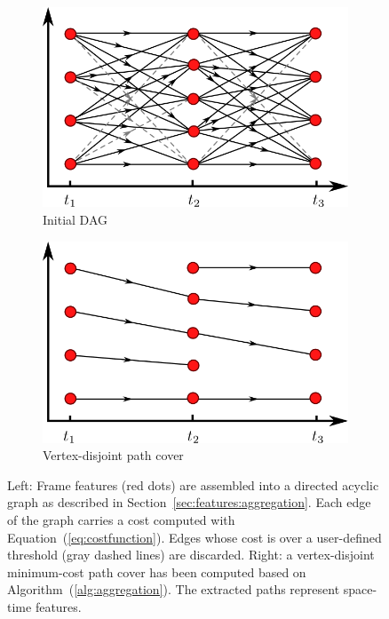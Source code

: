 \begin{figure}[t]
\centering
    \begin{subfigure}[b]{0.48\linewidth}
    \centering
    \includegraphics[width=\textwidth]{images/fluidsculpting-mig2016/dag_features.png}
    \caption{\label{fig:dagFeatures}Initial DAG}
    \end{subfigure}
    \hspace{0.1cm}
    \begin{subfigure}[b]{0.48\linewidth}
    \centering
    \includegraphics[width=\textwidth]{images/fluidsculpting-mig2016/aggregation_step2.png}
    \caption{\label{fig:aggregatedFeatures}Vertex-disjoint path cover}
    \end{subfigure}
    \caption[Fluid sculpting: Feature aggregation]{
    Left: Frame features (red dots) are assembled into a directed acyclic graph as described in Section~\ref{sec:features:aggregation}.
Each edge of the graph carries a cost computed with Equation~(\ref{eq:costfunction}). 
Edges whose cost is over a user-defined threshold (gray dashed lines) are discarded.
Right: a vertex-disjoint minimum-cost path cover has been computed based on Algorithm~(\ref{alg:aggregation}). 
The extracted paths represent space-time features.}
\label{fig:aggregation}
\end{figure}

